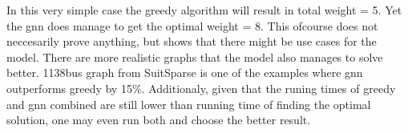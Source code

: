 In this very simple case the greedy algorithm will result in total weight = 5. Yet the \gls{gnn} does manage to get the optimal weight = 8. This ofcourse does not neccesarily prove anything, but shows that there might be use cases for the model. There are more realistic graphs that the model also manages to solve better. 1138bus graph from SuitSparse is one of the examples where \gls{gnn} outperforms greedy by 15\%. Additionaly, given that the runing times of greedy and \gls{gnn} combined are still lower than running time of finding the optimal solution, one may even run both and choose the better result.

